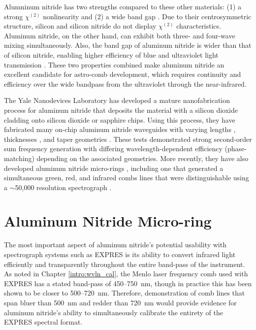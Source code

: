 Alumninum nitride has two strengths compared to these other materials: (1) a strong $\chi^{(2)}$ nonlinearity and (2) a wide band gap \citep{jung_aluminum_2016}. Due to their centrosymmetric structure, silicon and silicon nitride do not display $\chi^{(2)}$ characteristics. Aluminum nitride, on the other hand, can exhibit both three- and four-wave mixing simultaneously. Also, the band gap of aluminum nitride is wider than that of silicon nitride, enabling higher efficiency of blue and ultraviolet light transmission \citep{liu_beyond_2019}. These two properties combined make aluminum nitride an excellent candidate for astro-comb development, which requires continuity and efficiency over the wide bandpass from the ultraviolet through the near-infrared.

The Yale Nanodevices Laboratory has developed a mature nanofabrication process for aluminum nitride that deposits the material with a silicon dioxide cladding onto silicon dioxide or sapphire chips. Using this process, they have fabricated many on-chip aluminum nitride waveguides with varying lengths \citep[300~\si{\micro\meter}--3~\si{\centi\meter};][]{xiong_aluminum_2012}, thicknesses \citep[330--1500~\si{\nano\meter};][]{pernice_second_2012}, and taper geometries \citep{liu_beyond_2019}. These tests demonstrated strong second-order sum frequency generation with differing wavelength-dependent efficiency (phase-matching) depending on the associated geometries. More recently, they have also developed aluminum nitride micro-rings \citep{jung_optical_2013, guo_second-harmonic_2016}, including one that generated a simultaneous green, red, and infrared combs lines that were distinguishable using a $\sim$50,000 resolution spectrograph \citep{jung_green_2014}.

\section{Aluminum Nitride Micro-ring} \label{astro-comb:micro-ring}

The most important aspect of aluminum nitride's potential usability with spectrograph systems such as EXPRES is its ability to convert infrared light efficiently and transparently throughout the entire band-pass of the instrument. As noted in Chapter \ref{intro:wvln_cal}, the Menlo laser frequency comb used with EXPRES has a stated band-pass of 450--750~\si{\nano\meter}, though in practice this has been shown to be closer to 500--720~\si{\nano\meter}. Therefore, demonstration of comb lines that span bluer than 500~\si{\nano\meter} and redder than 720~\si{\nano\meter} would provide evidence for aluminum nitride's ability to simultaneously calibrate the entirety of the EXPRES spectral format.

